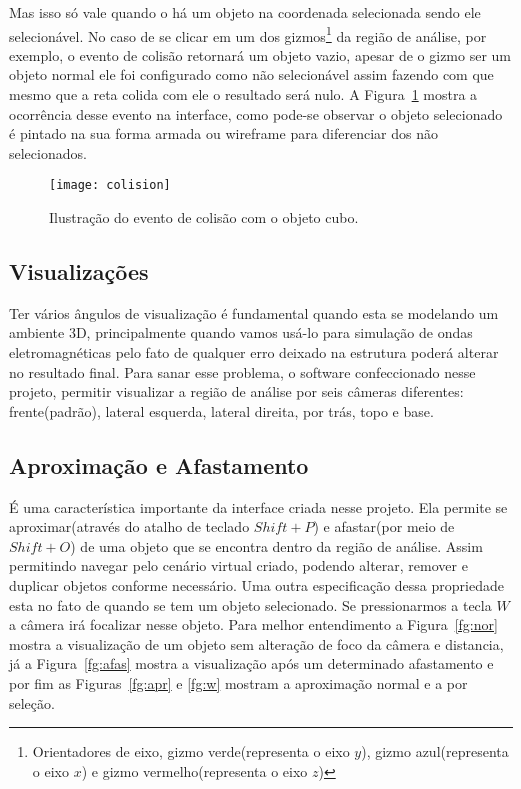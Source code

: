 	Mas isso só vale quando o há um objeto na coordenada selecionada sendo ele selecionável. No caso de se clicar em um dos gizmos\footnote{Orientadores de eixo, gizmo verde(representa o eixo $y$), gizmo azul(representa o eixo $x$) e gizmo vermelho(representa o eixo $z$)} da região de análise, por exemplo, o evento de colisão retornará um objeto vazio, apesar de o gizmo ser um objeto normal ele foi configurado como não selecionável assim fazendo com que mesmo que a reta colida com ele o resultado será nulo. A Figura~\ref{fg:colision} mostra a ocorrência desse evento na interface, como pode-se observar o objeto selecionado é pintado na sua forma armada ou wireframe para diferenciar dos não selecionados.
	
\begin{figure}[ht!]
	\centering
	\texttt{[image: colision]}
	\caption{Ilustração do evento de colisão com o objeto cubo.}
	\label{fg:colision}
\end{figure}

	\subsection{Visualizações}
	Ter vários ângulos de visualização é fundamental quando esta se modelando um ambiente 3D, principalmente quando vamos usá-lo para simulação de ondas eletromagnéticas pelo fato de qualquer erro deixado na estrutura poderá alterar no resultado final. Para sanar esse problema, o software confeccionado nesse projeto, permitir visualizar a região de análise por seis câmeras diferentes: frente(padrão), lateral esquerda, lateral direita, por trás, topo e base. 
	
	\subsection{Aproximação e Afastamento}
	É uma característica importante da interface criada nesse projeto. Ela permite se aproximar(através do atalho de teclado $Shift+P$) e afastar(por meio de $Shift+O$) de uma objeto que se encontra dentro da região de análise. Assim permitindo navegar pelo cenário virtual criado, podendo alterar, remover e duplicar objetos conforme necessário. Uma outra especificação dessa propriedade esta no fato de quando se tem um objeto selecionado. Se pressionarmos a tecla $W$ a câmera irá focalizar nesse objeto. Para melhor entendimento a Figura~\ref{fg:nor} mostra a visualização de um objeto sem alteração de foco da câmera e distancia, já a Figura~\ref{fg:afas} mostra a visualização após um determinado afastamento e por fim as Figuras~\ref{fg:apr} e \ref{fg:w} mostram a aproximação normal e a por seleção.

